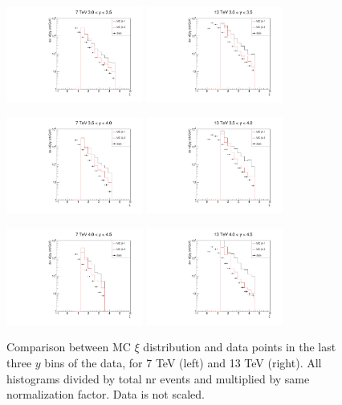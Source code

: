 \documentclass{article}
\begin{document}
\clearpage

\begin{figure}[h!]
\centering
\includegraphics[width = 0.4\textwidth]{xi_7_y7.pdf}
\includegraphics[width = 0.4\textwidth]{xi_13_y7.pdf}

\includegraphics[width = 0.4\textwidth]{xi_7_y8.pdf}
\includegraphics[width = 0.4\textwidth]{xi_13_y8.pdf}

\includegraphics[width = 0.4\textwidth]{xi_7_y9.pdf}
\includegraphics[width = 0.4\textwidth]{xi_13_y9.pdf}
\caption{Comparison between MC $\xi$ distribution and data points in the last three $y$ bins of the data, for 7 TeV (left) and 13 TeV (right). All histograms divided by total nr events and multiplied by same normalization factor. Data is not scaled.}\label{f:xi_comp_3}
\end{figure}
\end{document}
